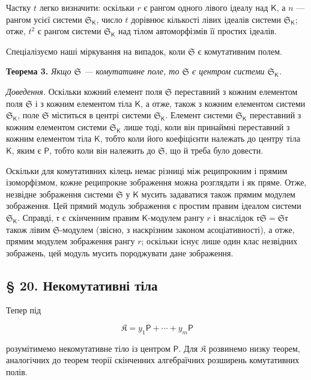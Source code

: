 \documentclass[11pt]{article}
\begin{document}
Частку \(t\) легко визначити: оскільки \(r\) є рангом одного лівого ідеалу над \(\mathsf K\), а \(n\) --- рангом усієї системи \(\mathfrak S_{\mathsf K}\), число \(t\) дорівнює кількості лівих ідеалів системи \(\mathfrak S_{\mathsf K}\); отже, \(t^2\) є рангом системи \(\mathfrak S_{\mathsf K}\) над тілом автоморфізмів її простих ідеалів.

Спеціалізуємо наші міркування на випадок, коли \(\mathfrak S\) є комутативним полем.

\textbf{Теорема 3.} \emph{Якщо \(\mathfrak S\) --- комутативне поле, то \(\mathfrak S\) є центром системи \(\mathfrak S_{\mathsf K}\).}

\emph{Доведення.} Оскільки кожний елемент поля \(\mathfrak S\) переставний з кожним елементом поля \(\mathfrak S\) і з кожним елементом тіла \(\mathsf K\), а отже, також з кожним елементом системи \(\mathfrak S_{\mathsf K}\), поле \(\mathfrak S\) міститься в центрі системи \(\mathfrak S_{\mathsf K}\). Елемент системи \(\mathfrak S_{\mathsf K}\) переставний з кожним елементом системи \(\mathfrak S_{\mathsf K}\) лише тоді, коли він принаймні переставний з кожним елементом тіла \(\mathsf K\), тобто коли його коефіцієнти належать до центру тіла \(\mathsf K\), яким є \(\mathsf P\), тобто коли він належить до \(\mathfrak S\), що й треба було довести.

Оскільки для комутативних кілець немає різниці між реципрокним і прямим ізоморфізмом, кожне реципрокне зображення можна розглядати і як пряме. Отже, незвідне зображення системи \(\mathfrak S\) у \(\mathsf K\) мусить задаватися також прямим модулем зображення. Цей прямий модуль зображення є простим правим ідеалом системи \(\mathfrak S_{\mathsf K}\). Справді, \(\mathfrak r\) є скінченним правим \(\mathsf K\)-модулем рангу \(r\) і внаслідок \(\mathfrak r\mathfrak S=\mathfrak S\mathfrak r\) також лівим \(\mathfrak S\)-модулем (звісно, з наскрізним законом асоціативності), а отже, прямим модулем зображення рангу \(r\); оскільки існує лише один клас незвідних зображень, цей модуль мусить породжувати дане зображення.

\subsection*{§ 20. Некомутативні тіла}\label{nichtkommutative-koerper}

Тепер під

\[
\mathfrak K=y_1\mathsf P+\cdots+y_m\mathsf P
\]

розумітимемо некомутативне тіло із центром \(\mathsf P\). Для \(\mathfrak K\) розвинемо низку теорем, аналогічних до теорем теорії скінченних алгебраїчних розширень комутативних полів.
\end{document}
